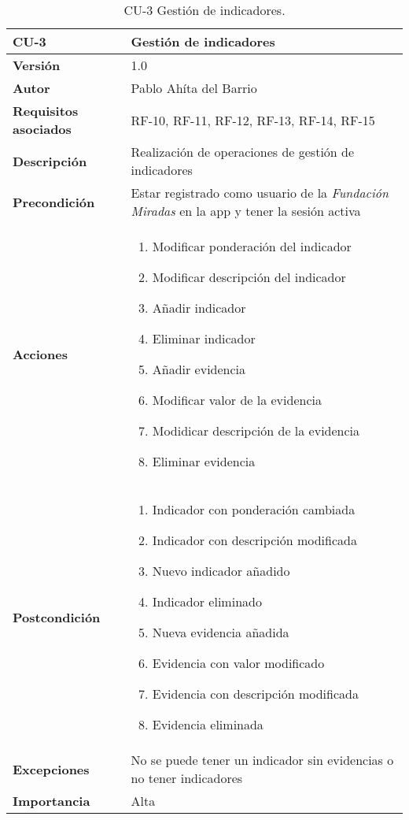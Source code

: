 \begin{table}[p]
	\centering
	\begin{tabularx}{\linewidth}{ p{} p{} }
		\toprule
		\textbf{CU-3}    & \textbf{Gestión de indicadores}\\
		\toprule
		\textbf{Versión}              & 1.0    \\
		\textbf{Autor}                & Pablo Ahíta del Barrio \\
		\textbf{Requisitos asociados} & RF-10, RF-11, RF-12, RF-13, RF-14, RF-15  \\
		\textbf{Descripción}          & Realización de operaciones de gestión de indicadores \\
		\textbf{Precondición}         & Estar registrado como usuario de la \textit{Fundación Miradas} en la app y tener la sesión activa \\
		\textbf{Acciones}             &
		\begin{enumerate}
			\def\labelenumi{\arabic{enumi}.}
			\tightlist
			\item Modificar ponderación del indicador
			\item Modificar descripción del indicador
			\item Añadir indicador
			\item Eliminar indicador
			\item Añadir evidencia
			\item Modificar valor de la evidencia
			\item Modidicar descripción de la evidencia
			\item Eliminar evidencia
		\end{enumerate}\\
		\textbf{Postcondición}        & 
		\begin{enumerate}
			\def\labelenumi{\arabic{enumi}.}
			\tightlist
			\item Indicador con ponderación cambiada
			\item Indicador con descripción modificada
			\item Nuevo indicador añadido
			\item Indicador eliminado
			\item Nueva evidencia añadida
			\item Evidencia con valor modificado
			\item Evidencia con descripción modificada
			\item Evidencia eliminada
		\end{enumerate}\\
		\textbf{Excepciones}          & No se puede tener un indicador sin evidencias o no tener indicadores \\
		\textbf{Importancia}          & Alta \\
		\bottomrule
	\end{tabularx}
	\caption{CU-3 Gestión de indicadores.}
\end{table}

